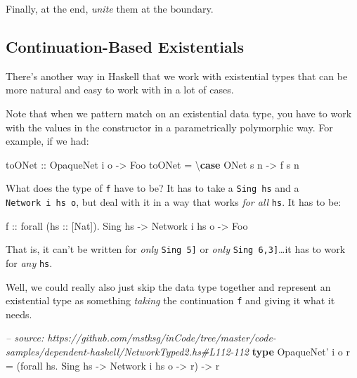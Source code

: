 \documentclass[]{article}
\newenvironment{Shaded}{}{}
\newcommand{\KeywordTok}[1]{\textcolor[rgb]{0.00,0.44,0.13}{\textbf{{#1}}}}
\newcommand{\DataTypeTok}[1]{\textcolor[rgb]{0.56,0.13,0.00}{{#1}}}
\newcommand{\CommentTok}[1]{\textcolor[rgb]{0.38,0.63,0.69}{\textit{{#1}}}}
\newcommand{\OtherTok}[1]{\textcolor[rgb]{0.00,0.44,0.13}{{#1}}}
\newcommand{\FunctionTok}[1]{\textcolor[rgb]{0.02,0.16,0.49}{{#1}}}
\newcommand{\NormalTok}[1]{{#1}}
\begin{document}
Finally, at the end, \emph{unite} them at the boundary.

\subsection{Continuation-Based
Existentials}\label{continuation-based-existentials}

There's another way in Haskell that we work with existential types that can be
more natural and easy to work with in a lot of cases.

Note that when we pattern match on an existential data type, you have to work
with the values in the constructor in a parametrically polymorphic way. For
example, if we had:

\begin{Shaded}
\begin{Highlighting}[]
\OtherTok{toONet ::} \DataTypeTok{OpaqueNet} \NormalTok{i o }\OtherTok{->} \DataTypeTok{Foo}
\NormalTok{toONet }\FunctionTok{=} \NormalTok{\textbackslash{}}\KeywordTok{case} \DataTypeTok{ONet} \NormalTok{s n }\OtherTok{->} \NormalTok{f s n}
\end{Highlighting}
\end{Shaded}

What does the type of \texttt{f} have to be? It has to take a \texttt{Sing\ hs}
and a \texttt{Network\ i\ hs\ o}, but deal with it in a way that works \emph{for
all} \texttt{hs}. It has to be:

\begin{Shaded}
\begin{Highlighting}[]
\OtherTok{f ::} \NormalTok{forall (}\OtherTok{hs ::} \NormalTok{[}\DataTypeTok{Nat}\NormalTok{])}\FunctionTok{.} \DataTypeTok{Sing} \NormalTok{hs }\OtherTok{->} \DataTypeTok{Network} \NormalTok{i hs o }\OtherTok{->} \DataTypeTok{Foo}
\end{Highlighting}
\end{Shaded}

That is, it can't be written for \emph{only}
\texttt{Sing\ \textquotesingle{}{[}5{]}} or \emph{only}
\texttt{Sing\ \textquotesingle{}{[}6,3{]}}\ldots{}it has to work for \emph{any}
\texttt{hs}.

Well, we could really also just skip the data type together and represent an
existential type as something \emph{taking} the continuation \texttt{f} and
giving it what it needs.

\begin{Shaded}
\begin{Highlighting}[]
\CommentTok{-- source: https://github.com/mstksg/inCode/tree/master/code-samples/dependent-haskell/NetworkTyped2.hs#L112-112}
\KeywordTok{type} \DataTypeTok{OpaqueNet'} \NormalTok{i o r }\FunctionTok{=} \NormalTok{(forall hs}\FunctionTok{.} \DataTypeTok{Sing} \NormalTok{hs }\OtherTok{->} \DataTypeTok{Network} \NormalTok{i hs o }\OtherTok{->} \NormalTok{r) }\OtherTok{->} \NormalTok{r}
\end{Highlighting}
\end{Shaded}
\end{document}
